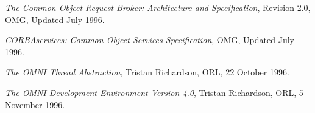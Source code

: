 \documentclass[11pt,twoside,onecolumn]{book}
\begin{document}
\backmatter

\begin{thebibliography}{tjr96}

{\em The Common Object Request Broker: Architecture and
  Specification}, 
Revision 2.0, 
OMG,
Updated July 1996.

{\em CORBAservices: Common Object Services Specification},
OMG,
Updated July 1996.

{\em The OMNI Thread Abstraction},
Tristan Richardson, ORL, 22 October 1996.

{\em The OMNI Development Environment Version 4.0},
Tristan Richardson, ORL, 5 November 1996.

\end{thebibliography}
\end{document}
